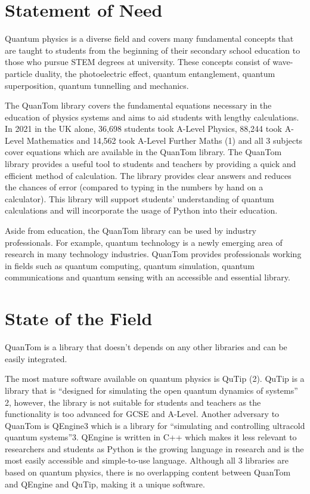 \documentclass{article}
\begin{document}
\section{Statement of Need}
Quantum physics is a diverse field and covers many fundamental concepts that are taught to students from the beginning of their secondary school education to those who pursue STEM degrees at university. These concepts consist of wave-particle duality, the photoelectric effect, quantum entanglement, quantum superposition, quantum tunnelling and mechanics. 

The QuanTom library covers the fundamental equations necessary in the education of physics systems and aims to aid students with lengthy calculations. In 2021 in the UK alone, 36,698 students took  A-Level Physics, 88,244 took A-Level Mathematics and 14,562 took A-Level Further Maths (1) and all 3 subjects cover equations which are available in the QuanTom library.  The QuanTom library provides a useful tool to students and teachers by providing a quick and efficient method of calculation. The library provides clear answers and reduces the chances of error (compared to typing in the numbers by hand on a calculator). This library will support students’ understanding of quantum calculations and will incorporate the usage of Python into their education. 

Aside from education, the QuanTom library can be used by industry professionals. For example, quantum technology is a newly emerging area of research in many technology industries. QuanTom provides professionals working in fields such as quantum computing, quantum simulation, quantum communications and quantum sensing with an accessible and essential library. 


\section{State of the Field}
QuanTom is a library that doesn't depends on any other libraries and can be easily integrated.

The most mature software available on quantum physics is QuTip (2). QuTip is a library that is “designed for simulating the open quantum dynamics of systems” 2, however, the library is not suitable for students and teachers as the functionality is too advanced for GCSE and A-Level. 
Another adversary to QuanTom is QEngine3 which is a library for “simulating and controlling ultracold quantum systems”3. QEngine is written in C++ which makes it less relevant to researchers and students as Python is the growing language in research and is the most easily accessible and simple-to-use language. Although all 3 libraries are based on quantum physics, there is no overlapping content between QuanTom and QEngine and QuTip, making it a unique software.
\end{document}
